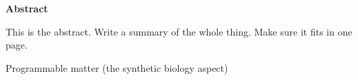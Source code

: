 \newpage
{\Huge \bf Abstract}
\vspace{24pt} 


This is the abstract. Write a summary of the whole thing. Make 
sure it fits in one page. 

Programmable matter (the synthetic biology aspect)


\newpage
\vspace*{\fill}
